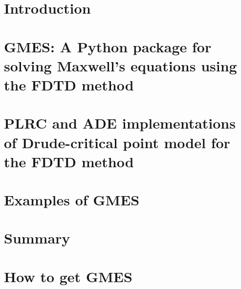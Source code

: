 \documentclass{gist}
\begin{document}
\chapter{Introduction}
\label{ch:intro}


\chapter{GMES: A Python package for solving Maxwell's equations using the FDTD method}
\label{ch:oop_fdtd}


\chapter{PLRC and ADE implementations of Drude-critical point model for the FDTD method}
\label{ch:dcp}


\chapter{Examples of GMES}
\label{ch:example}


\chapter{Summary}
\label{ch:summary}


\appendix
\chapter{How to get GMES}
\label{ch:get_gmes}






\printindex

\end{document}
